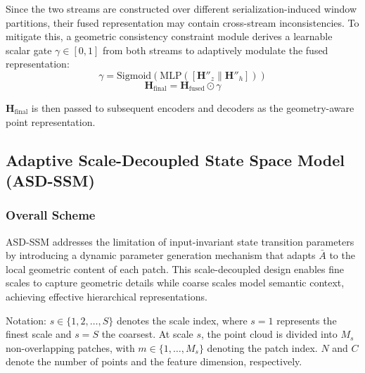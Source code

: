 \documentclass[letterpaper,journal]{IEEEtran}
\begin{document}
Since the two streams are constructed over different serialization-induced window partitions, their fused representation may contain cross-stream inconsistencies. To mitigate this, a geometric consistency constraint module derives a learnable scalar gate $\gamma \in [0,1]$ from both streams to adaptively modulate the fused representation:
\begin{equation}
\gamma = \text{Sigmoid}(\text{MLP}([\mathbf{H}''_z \| \mathbf{H}''_h]))
\end{equation}
\begin{equation}
\mathbf{H}_{\text{final}} = \mathbf{H}_{\text{fused}} \odot \gamma
\end{equation}

$\mathbf{H}_{\text{final}}$ is then passed to subsequent encoders and decoders as the geometry-aware point representation.


\subsection{Adaptive Scale-Decoupled State Space Model (ASD-SSM)}

\subsubsection{Overall Scheme}
ASD-SSM addresses the limitation of input-invariant state transition parameters  by introducing a dynamic parameter generation mechanism that adapts $\bar{A}$ to the local geometric content of each patch. This scale-decoupled design enables fine scales to capture geometric details while coarse scales model semantic context, achieving effective hierarchical representations.

Notation: $s \in \{1, 2, \ldots, S\}$ denotes the scale index, where $s=1$ represents the finest scale and $s=S$ the coarsest. At scale $s$, the point cloud is divided into $M_s$ non-overlapping patches, with $m \in \{1, \ldots, M_s\}$ denoting the patch index. $N$ and $C$ denote the number of points and the feature dimension, respectively.
\end{document}
